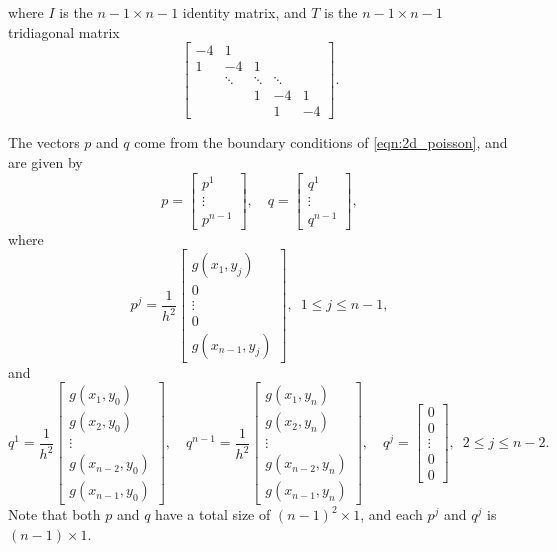 \noindent where $I$ is the $n-1\times n-1$ identity matrix, and $T$ is the $n-1\times n-1$ tridiagonal matrix
\[\begin{bmatrix}
-4 & 1 & &  &\\
1 &-4 & 1 & &\\
&\ddots  & \ddots & \ddots & \\
&  & 1 & -4 & 1 \\
&  &  & 1 & -4 \end{bmatrix}.\]

The vectors $p$ and $q$ come from the boundary conditions of \eqref{eqn:2d_poisson}, and are given by 
\[p = \begin{bmatrix} p^1 \\ \vdots \\ p^{n-1} \end{bmatrix}, \quad  q = \begin{bmatrix} q^1 \\ \vdots \\ q^{n-1} \end{bmatrix},\]
where 
\[p^j = \frac{1}{h^2} \begin{bmatrix} g(x_1,y_j)\\ 0 \\ \vdots \\0\\ g(x_{n-1},y_j) \end{bmatrix} ,\,\,\, 1 \leq j \leq n-1,\]
and 
\[q^1 = \frac{1}{h^2}\begin{bmatrix} g(x_1,y_0)  \\ g(x_2,y_0) \\ \vdots \\ g(x_{n-2},y_0) \\ g(x_{n-1},y_0) \end{bmatrix}, \quad q^{n-1} = \frac{1}{h^2}\begin{bmatrix} g(x_1,y_n) \\ g(x_2,y_n)\\ \vdots \\ g(x_{n-2},y_n)\\ g(x_{n-1},y_n) \end{bmatrix}, \quad q^{j} = \begin{bmatrix} 0 \\ 0 \\ \vdots \\ 0 \\ 0 \end{bmatrix} ,\,\,\, 2 \leq j \leq n-2.\]
Note that both $p$ and $q$ have a total size of $(n-1)^2 \times 1$, and each $p^j$ and $q^j$ is $(n-1)\times1$.

